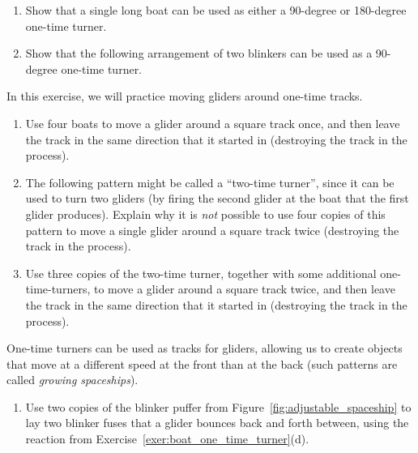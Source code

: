 \begin{multicols}{2}
\begin{problem}
\begin{enumerate}[label=(\alph*)]
		\item Show that a single long boat can be used as either a 90-degree or 180-degree one-time turner.
		
		\item Show that the following arrangement of two blinkers can be used as a 90-degree one-time turner.
		\begin{center}
		\end{center}
	\end{enumerate}
\end{problem}


\mfilbreak


\begin{problem}\label{exer:turner_tracks}
	In this exercise, we will practice moving gliders around one-time tracks.
	\begin{enumerate}[label=(\alph*)]
		\item Use four boats to move a glider around a square track once, and then leave the track in the same direction that it started in (destroying the track in the process).
		
		\item The following pattern might be called a ``two-time turner'', since it can be used to turn two gliders (by firing the second glider at the boat that the first glider produces). Explain why it is \emph{not} possible to use four copies of this pattern to move a single glider around a square track twice (destroying the track in the process).
		\begin{center}
		\end{center}
		
		\item Use three copies of the two-time turner, together with some additional one-time-turners, to move a glider around a square track twice, and then leave the track in the same direction that it started in (destroying the track in the process).
	\end{enumerate}
\end{problem}

\mfilbreak

\begin{problem}\label{exer:one_time_track}
	One-time turners can be used as tracks for gliders, allowing us to create objects that move at a different speed at the front than at the back (such patterns are called \emph{growing spaceships}).
	\begin{enumerate}[label=(\alph*)]
		\item Use two copies of the blinker puffer from Figure~\ref{fig:adjustable_spaceship} to lay two blinker fuses that a glider bounces back and forth between, using the reaction from Exercise~\ref{exer:boat_one_time_turner}(d).
		

\end{enumerate}
\end{problem}
\end{multicols}
